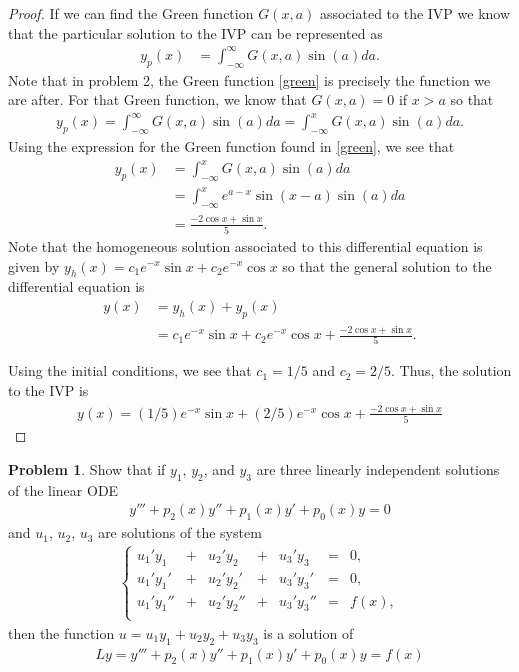 \documentclass[12pt]{article}
\theoremstyle{definition}
\newtheorem{problem}{Problem}
\begin{document}
\begin{proof}
  If we can find the Green function $G(x,a)$ associated to the IVP we know that
  the particular solution to the IVP can be represented as
  \begin{align*}
    y_p(x) &= \int_{-\infty}^{\infty}G(x,a)\sin(a) da.
  \end{align*}
  Note that in problem 2, the Green function \eqref{green} is precisely the function
  we are after. For that Green function, we know that $G(x,a) = 0$ if $x>a$ so that
  \begin{align*}
    y_p(x) = \int_{-\infty}^{\infty}G(x,a)\sin(a)da = \int_{-\infty}^{x}G(x,a)\sin(a)da.
  \end{align*}
  Using the expression for the Green function found in \eqref{green}, we see that
  \begin{align*}
    y_p(x) &= \int_{-\infty}^{x}G(x,a)\sin(a)da \\
    &= \int_{-\infty}^{x} e^{a-x}\sin(x-a)\sin(a)da\\
    &= \frac{-2\cos x + \sin x}{5}.
  \end{align*}
  Note that the homogeneous solution associated to this differential equation is
  given by $y_h(x) = c_1e^{-x}\sin x + c_2 e^{-x} \cos x$ so that the general solution
  to the differential equation is
  \begin{align*}
    y(x) &= y_h(x) + y_p(x) \\
    &= c_1e^{-x}\sin x + c_2 e^{-x}\cos x + \frac{-2\cos x + \sin x}{5}.
  \end{align*}

  Using the initial conditions, we see that $c_1 =1/5 $ and $c_2 = 2/5$.
  Thus, the solution to the IVP is
  \begin{align}
    y(x) = (1/5)e^{-x}\sin x + (2/5)e^{-x}\cos x + \frac{-2\cos x + \sin x}{5}
  \end{align}
\end{proof}
\newpage


\begin{problem}
  Show that if $y_1$, $y_2$, and $y_3$ are three linearly independent solutions
  of the linear ODE
  \begin{align*}
    y''' + p_2(x)y'' + p_1(x)y' + p_0(x) y = 0
  \end{align*}
  and $u_1$, $u_2$, $u_3$ are solutions of the system
  \begin{align}\label{u_system}
    \left\{
      \begin{array}{lllllll}
        u_1'y_1 &+& u_2'y_2 &+& u_3'y_3 &=& 0, \\
        u_1'y_1' &+& u_2'y_2' &+& u_3'y_3' &=& 0, \\
        u_1'y_1'' &+& u_2'y_2'' &+& u_3'y_3'' &=& f(x), \\
      \end{array}
    \right.
  \end{align}
  then the function $u = u_1 y_1 + u_2 y_2 + u_3 y_3$ is a solution of
  \begin{align*}
    Ly = y''' + p_2(x)y'' + p_1(x)y' + p_0(x) y = f(x)
  \end{align*}
\end{problem}
\end{document}
